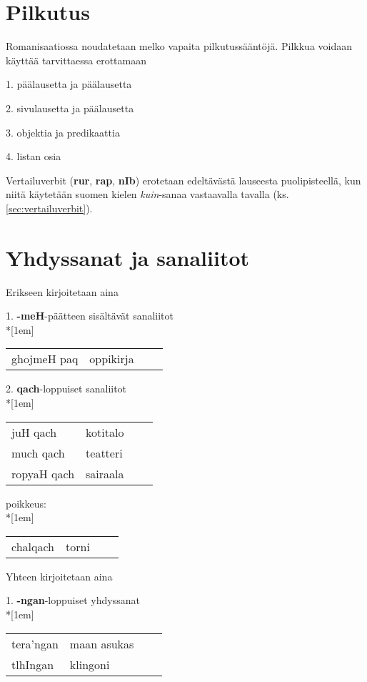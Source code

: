 \documentclass{book}
\begin{document}
\section{Pilkutus}

Romanisaatiossa noudatetaan melko vapaita pilkutussääntöjä.
Pilkkua voidaan käyttää tarvittaessa erottamaan

1. päälausetta ja päälausetta

2. sivulausetta ja päälausetta

3. objektia ja predikaattia

4. listan osia

Vertailuverbit (\textbf{rur}, \textbf{rap}, \textbf{nIb}) erotetaan edeltävästä lauseesta puolipisteellä, kun niitä käytetään suomen kielen \textit{kuin}-sanaa vastaavalla tavalla (ks. \ref{sec:vertailuverbit}).

\section{Yhdyssanat ja sanaliitot}

Erikseen kirjoitetaan aina

1. \textbf{-meH}-päätteen sisältävät sanaliitot\\*[1em]
\begin{tabular}{Bl Il}
    ghojmeH paq & oppikirja \\
\end{tabular}

2. \textbf{qach}-loppuiset sanaliitot\\*[1em]
\begin{tabular}{Bl Il}
    juH qach & kotitalo \\
    much qach & teatteri \\
    ropyaH qach & sairaala \\
\end{tabular}

poikkeus:\\*[1em]
\begin{tabular}{Bl Il}
    chalqach & torni \\
\end{tabular}

Yhteen kirjoitetaan aina

1. \textbf{-ngan}-loppuiset yhdyssanat\\*[1em]
\begin{tabular}{Bl Il}
    tera'ngan & maan asukas \\
    tlhIngan & klingoni \\
\end{tabular}
\end{document}
